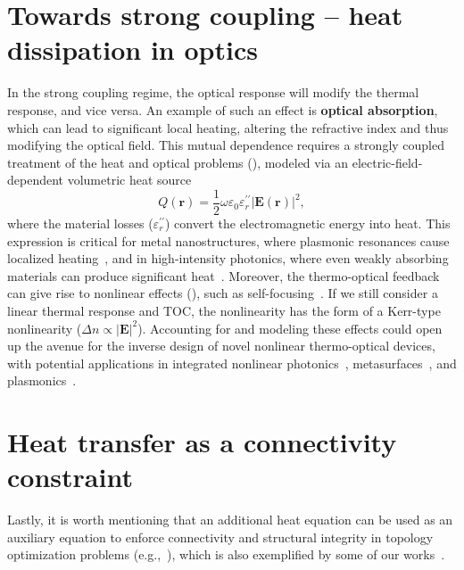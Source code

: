 \section{Towards strong coupling -- heat dissipation in optics}\label{sec:thermo_strong_coupling}

In the strong coupling regime, the optical response will modify the thermal response, and vice versa.
An example of such an effect is \textbf{optical absorption}, which can lead to significant local heating, altering the refractive index and thus modifying the optical field. 
This mutual dependence requires a strongly coupled treatment of the heat and optical problems (), modeled via an electric-field-dependent volumetric heat source~\cite{plasm_heat_source}
\[
Q(\mathbf{r}) = \frac{1}{2} \omega \varepsilon_0 \varepsilon_r^{\prime \prime} |\mathbf{E}(\mathbf{r})|^2,
\]
where the material losses ($\varepsilon_r^{\prime \prime}$) convert the electromagnetic energy into heat. 
This expression is critical for metal nanostructures, where plasmonic resonances cause localized heating~\cite{plasm_heat_source}, and in high-intensity photonics, where even weakly absorbing materials can produce significant heat~\cite{thermal_nl, high_I_T}. Moreover, the thermo-optical feedback can give rise to nonlinear effects (), such as self-focusing~\cite{thermal_nl}. If we still consider a linear
thermal response and TOC,
the nonlinearity has the form of a Kerr-type nonlinearity ($\Delta n \propto \vert \mathbf{E} \vert^2$). Accounting for and modeling
these effects could open up the avenue for the inverse design of novel nonlinear thermo-optical devices, with potential applications
in integrated nonlinear photonics~\cite{nl_photonics}, metasurfaces~\cite{nl_meta}, and plasmonics~\cite{novotny}.

\section{Heat transfer as a connectivity constraint}\label{sec:aux}

Lastly, it is worth mentioning that an additional heat equation can be used as an auxiliary equation to enforce connectivity
and structural integrity in topology optimization problems (e.g.,~\cite{vanessa, structural_heat}), which is also exemplified by some of our
works~\cite{ownpub1,ownpub2}. 

